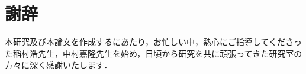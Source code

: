 \pagestyle{plain}
\chapter*{謝辞}

本研究及び本論文を作成するにあたり，お忙しい中，熱心にご指導してくださった稲村浩先生，中村嘉隆先生を始め，日頃から研究を共に頑張ってきた研究室の方々に深く感謝いたします．
